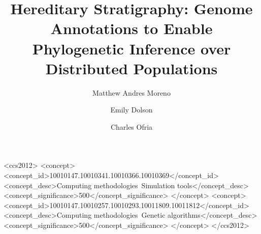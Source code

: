 \title{ Hereditary Stratigraphy: Genome Annotations to Enable Phylogenetic Inference over Distributed Populations }

\author{Matthew Andres Moreno}
\author{Emily Dolson}
\author{Charles Ofria}


\renewcommand{\shortauthors}{Moreno et al.}

\begin{CCSXML}
<ccs2012>
   <concept>
       <concept_id>10010147.10010341.10010366.10010369</concept_id>
       <concept_desc>Computing methodologies~Simulation tools</concept_desc>
       <concept_significance>500</concept_significance>
       </concept>
   <concept>
       <concept_id>10010147.10010257.10010293.10011809.10011812</concept_id>
       <concept_desc>Computing methodologies~Genetic algorithms</concept_desc>
       <concept_significance>500</concept_significance>
       </concept>
 </ccs2012>
\end{CCSXML}





\maketitle

